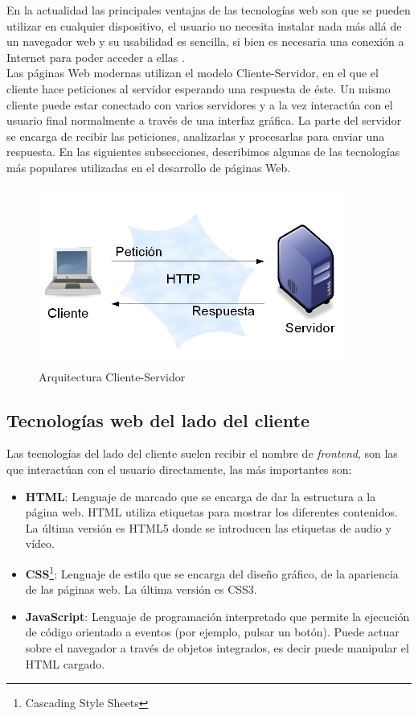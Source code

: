 En la actualidad las principales ventajas de las tecnologías web son que se pueden utilizar en cualquier dispositivo, el usuario no necesita instalar nada más allá de un navegador web y su usabilidad es sencilla, si bien es necesaria una conexión a Internet para poder acceder a ellas \cite{juan}.\\

Las páginas Web modernas utilizan el modelo Cliente-Servidor, en el que el cliente hace peticiones al servidor esperando una respuesta de éste. Un mismo cliente puede estar conectado con varios servidores y a la vez interactúa con el usuario final normalmente a través de una interfaz gráfica. La parte del servidor se encarga de recibir las peticiones, analizarlas y procesarlas para enviar una respuesta. En las siguientes subsecciones, describimos algunas de las tecnologías más populares utilizadas en el desarrollo de páginas Web.

\begin{figure}[H]
    \centering
    \includegraphics[width=10cm, keepaspectratio]{img/arquitectura.png}
    \caption{Arquitectura Cliente-Servidor}
    \label{fig:arquitectura}
\end{figure}

\subsection{Tecnologías web del lado del cliente}
Las tecnologías del lado del cliente suelen recibir el nombre de \textit{frontend}, son las que interactúan con el usuario directamente, las más importantes son:

\begin{itemize}
  \item \textbf{HTML}:  Lenguaje de marcado que se encarga de dar la estructura a la página web. HTML utiliza etiquetas para mostrar los diferentes contenidos. La última versión es HTML5 donde se introducen las etiquetas de audio y vídeo.
  \item \textbf{CSS}\footnote{Cascading Style Sheets}: Lenguaje de estilo que se encarga del diseño gráfico, de la apariencia de las páginas web. La última versión es CSS3.
  \item \textbf{JavaScript}: Lenguaje de programación interpretado que permite la ejecución de código orientado a eventos (por ejemplo, pulsar un botón). Puede actuar sobre el navegador a través de objetos integrados, es decir puede manipular el HTML cargado.
\end{itemize}

